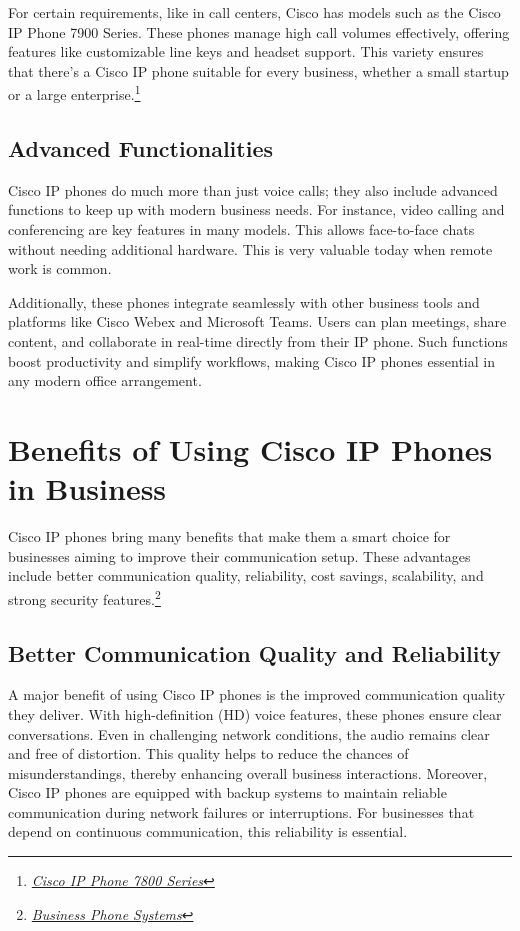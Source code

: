 \documentclass[11pt,a4paper]{article}
\begin{document}
For certain requirements, like in call centers, Cisco has models such as the Cisco IP Phone 7900 Series. These phones manage high call volumes effectively, offering features like customizable line keys and headset support. This variety ensures that there’s a Cisco IP phone suitable for every business, whether a small startup or a large enterprise.\footnote{\href{https://www.cisco.com/c/en/us/products/collaboration-endpoints/unified-ip-phone-7800-series/index.html}{\textit{Cisco IP Phone 7800 Series}}}


\subsection*{Advanced Functionalities}

Cisco IP phones do much more than just voice calls; they also include advanced functions to keep up with modern business needs. For instance, video calling and conferencing are key features in many models. This allows face-to-face chats without needing additional hardware. This is very valuable today when remote work is common.

Additionally, these phones integrate seamlessly with other business tools and platforms like Cisco Webex and Microsoft Teams. Users can plan meetings, share content, and collaborate in real-time directly from their IP phone. Such functions boost productivity and simplify workflows, making Cisco IP phones essential in any modern office arrangement.


\section*{Benefits of Using Cisco IP Phones in Business}

Cisco IP phones bring many benefits that make them a smart choice for businesses aiming to improve their communication setup. These advantages include better communication quality, reliability, cost savings, scalability, and strong security features.\footnote{\href{https://www.cisco.com/c/en/us/solutions/small-business/collaboration/phone-systems.html}{\textit{Business Phone Systems}}}

\subsection*{Better Communication Quality and Reliability}

A major benefit of using Cisco IP phones is the improved communication quality they deliver. With high-definition (HD) voice features, these phones ensure clear conversations. Even in challenging network conditions, the audio remains clear and free of distortion. This quality helps to reduce the chances of misunderstandings, thereby enhancing overall business interactions. Moreover, Cisco IP phones are equipped with backup systems to maintain reliable communication during network failures or interruptions. For businesses that depend on continuous communication, this reliability is essential.
\end{document}
